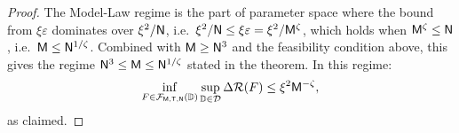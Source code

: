 \documentclass[11pt]{article}
\theoremstyle{plain}
\begin{document}
\begin{proof}
    The Model-Law regime is the part of parameter space where the bound from $\xi\varepsilon$ dominates over $\xi^2/{\sf N}$, i.e.~$\xi^2/{\sf N} \leq \xi\varepsilon = \xi^2/{\sf M}^\zeta$, which holds when ${\sf M}^\zeta \leq {\sf N}$, i.e.~${\sf M} \leq {\sf N}^{1/\zeta}$. Combined with ${\sf M} \geq {\sf N}^3$ and the feasibility condition above, this gives the regime ${\sf N}^3 \leq {\sf M} \leq {\sf N}^{1/\zeta}$ stated in the theorem. In this regime:
    \begin{align*}
        \inf_{F \in {\cal F}_{\sf M, T, N}(\mathbb{D})} \sup_{\mathbb{D} \in {\cal D}}  \Delta{\cal R}(F)  \leq \xi^2 {\sf M}^{-\zeta},
    \end{align*}
    as claimed.
\end{proof}



\newpage%
% 


\ifdefined\isarxiv
\else
\newpage

\fi










\end{document}
